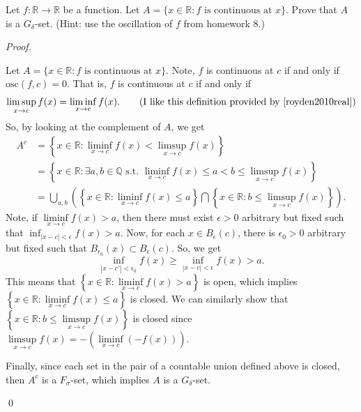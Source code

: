 \documentclass[12pt]{article}
\newenvironment{problem}[2][Problem]{\begin{trivlist}
\item[\hskip \labelsep {\bfseries #1}\hskip \labelsep {\bfseries
#2.}]}{\end{trivlist}}
\newenvironment{sol}
    {\emph{Proof.}
    }
    {
    \qed
    }
\begin{document}
\begin{problem}{35}
Let $f : \mathbb{R} \to \mathbb{R}$ be a function. Let $A = \{x \in \mathbb{R} : f \text{ is continuous at } x\}$. Prove that $A$ is a $G_\delta$-set. (Hint: use the oscillation of $f$ from homework 8.)
\end{problem}
\begin{sol}
Let $A = \{x \in \mathbb{R} : f \text{ is continuous at } x\}$. Note, $f$ is continuous at $c$ if and only if $\text{osc}(f,c) = 0$. That is, $f$ is continuous at $c$ if and only if \begin{align*}
    \limsup\limits_{x\to c}f(x) = \liminf\limits_{x \to c}f(x). \tag*{(I like this definition provided by \cite{royden2010real})}
\end{align*}
So, by looking at the complement of $A$, we get \begin{align*}
    A^c &= \left\{x \in \mathbb{R} : \liminf\limits_{x \to c}f(x) < \limsup\limits_{x\to c}f(x)\right\} \\
    &= \left\{ x \in \mathbb{R} : \exists a,b \in \mathbb{Q} \text{ s.t. } \liminf\limits_{x \to c}f(x) \leq a < b \leq \limsup\limits_{x\to c}f(x) \right\} \\
    &= \bigcup_{a,b} \left( \left\{ x \in \mathbb{R} : \liminf\limits_{x \to c}f(x) \leq a \right\} \bigcap \left\{ x \in \mathbb{R} : b \leq \limsup\limits_{x\to c}f(x) \right\} \right). \tag*{(with $a < b$)}
\end{align*}
\hspace{1em}Note, if $\liminf\limits_{x \to c}f(x) > a$, then there must exist $\epsilon > 0$ arbitrary but fixed such that $\inf_{\left| x - c \right| < \epsilon}f(x) > a$. Now, for each $x \in B_\epsilon(c)$, there is $\epsilon_0 > 0$ arbitrary but fixed such that $B_{\epsilon_0}(x) \subset B_\epsilon(c)$. So, we get $$\inf_{\left| x - c' \right| < \epsilon_0}f(x) \geq \inf_{\left| x - c \right| < \epsilon}f(x) > a.$$ This means that $\left\{ x \in \mathbb{R} : \liminf\limits_{x \to c}f(x) > a \right\}$ is open, which implies $\left\{ x \in \mathbb{R} : \liminf\limits_{x \to c}f(x) \leq a \right\}$ is closed. We can similarly show that $\left\{ x \in \mathbb{R} : b \leq \limsup\limits_{x\to c}f(x) \right\}$ is closed since $\limsup\limits_{x\to c}f(x) = - \left( \liminf\limits_{x \to c}(-f(x)) \right)$.

Finally, since each set in the pair of a countable union defined above is closed, then $A^c$ is a $F_\sigma$-set, which implies $A$ is a $G_\delta$-set.
\end{sol}
\end{document}
